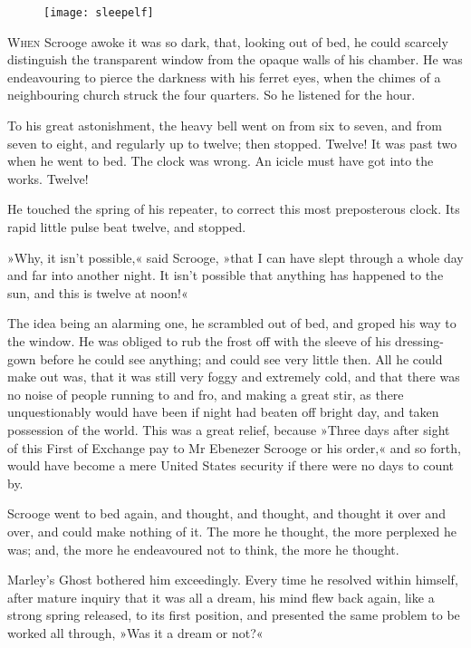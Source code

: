 \begin{figure}[h]
\centering
\texttt{[image: sleepelf]}
\caption[Headpiece to Stave II]{}
\end{figure}

\lettrine[lines=4]{W}{hen} Scrooge awoke it was so dark, that, looking out of bed, he could scarcely distinguish the transparent window from the opaque walls of his chamber. He was endeavouring to pierce the darkness with his ferret eyes, when the chimes of a neighbouring church struck the four quarters. So he listened for the hour.

To his great astonishment, the heavy bell went on from six to seven, and from seven to eight, and regularly up to twelve; then stopped. Twelve! It was past two when he went to bed. The clock was wrong. An icicle must have got into the works. Twelve!

He touched the spring of his repeater, to correct this most preposterous clock. Its rapid little pulse beat twelve, and stopped.

»Why, it isn't possible,« said Scrooge, »that I can have slept  through a whole day and far into another night. It isn't possible that anything has happened to the sun, and this is twelve at noon!«

The idea being an alarming one, he scrambled out of bed, and groped his way to the window. He was obliged to rub the frost off with the sleeve of his dressing-gown before he could see anything; and could see very little then. All he could make out was, that it was still very foggy and extremely cold, and that there was no noise of people running to and fro, and making a great stir, as there unquestionably would have been if night had beaten off bright day, and taken possession of the world. This was a great relief, because »Three days after sight of this First of Exchange pay to Mr Ebenezer Scrooge or his order,« and so forth, would have become a mere United States security if there were no days to count by.

Scrooge went to bed again, and thought, and thought, and  thought it over and over, and could make nothing of it. The more he thought, the more perplexed he was; and, the more he endeavoured not to think, the more he thought.

Marley's Ghost bothered him exceedingly. Every time he resolved within himself, after mature inquiry that it was all a dream, his mind flew back again, like a strong spring released, to its first position, and presented the same problem to be worked all  through, »Was it a dream or not?«

